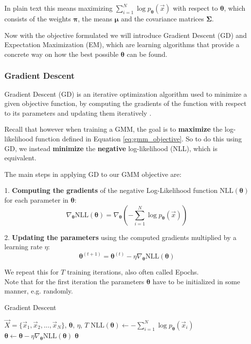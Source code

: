 In plain text this means maximizing $\sum_{i=1}^{N} \log p_{\boldsymbol{\theta}}(\vec x)$ with respect to $\boldsymbol{\theta}$, which consists of the weights $\boldsymbol \pi$, the means $\boldsymbol \mu$ and the covariance matrices $\boldsymbol \Sigma$.

Now with the objective formulated we will introduce Gradient Descent (GD) and Expectation Maximization (EM), which are learning algorithms
that provide a concrete way on how the best possible $\boldsymbol{\theta}$ can be found. 

\subsubsection{Gradient Descent}
\label{sec:gmm_sgd}

Gradient Descent (GD) is an iterative optimization algorithm used to minimize a given objective function, by  
computing the gradients of the function with respect to its parameters and updating them iteratively \cite{deepl}.

Recall that however when training a GMM, the goal is to \textbf{maximize} the log-likelihood function defined in Equation \ref{eq:gmm_objective}. 
So to do this using GD, we instead \textbf{minimize} the \textbf{negative} log-likelihood (NLL), which is equivalent.

The main steps in applying GD to our GMM objective are: 

1. \textbf{Computing the gradients} of the negative Log-Likelihood function $\text{NLL}(\boldsymbol{\theta})$ for each parameter in $\boldsymbol{\theta}$: 
\[
    \nabla_{\boldsymbol{\theta}} \text{NLL}(\boldsymbol{\theta}) = \nabla_{\boldsymbol{\theta}} (- \sum_{i=1}^{N} \log p_{\boldsymbol{\theta}}(\vec x))
\]

2. \textbf{Updating the parameters} using the computed gradients multiplied by a learning rate $\eta$:
\[
    \boldsymbol{\theta}^{(t+1)} = \boldsymbol{\theta}^{(t)} - \eta \nabla_{\boldsymbol{\theta}} \text{NLL}(\boldsymbol{\theta})
\]

We repeat this for $T$ training iterations, also often called Epochs. \\
Note that for the first iteration the parameters $\boldsymbol{\theta}$ have to be initialized in some manner, e.g. randomly. 

\begin{algorithm}
    \caption{Gradient Descent}
    \label{alg:gd_gmm}
    \begin{algorithmic}[1]  
        \Require $\vec X = \{\vec x_1, \vec x_2, ..., \vec x_N\}$, $\boldsymbol{\theta}$, $\eta$, $T$
            \State $\text{NLL}(\boldsymbol{\theta}) \gets - \sum_{i=1}^{N} \log p_{\boldsymbol{\theta}}(\vec x_i)$
            \State $\boldsymbol{\theta} \gets \boldsymbol{\theta} - \eta \nabla_{\boldsymbol{\theta}} \text{NLL}(\boldsymbol{\theta})$
        \EndFor
        \State \Return $\boldsymbol{\theta}$
    \end{algorithmic}
\end{algorithm}

